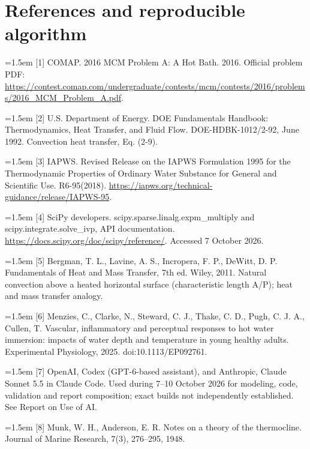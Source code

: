 \documentclass[12pt,a4paper]{article}
\begin{document}
\section{References and reproducible algorithm}
\begingroup\normalsize\setlength{\parindent}{0pt}\hangindent=1.5em [1] COMAP. 2016 MCM Problem A: A Hot Bath. 2016. Official problem PDF: \url{https://contest.comap.com/undergraduate/contests/mcm/contests/2016/problems/2016_MCM_Problem_A.pdf}.\par\endgroup
\begingroup\normalsize\setlength{\parindent}{0pt}\hangindent=1.5em [2] U.S. Department of Energy. DOE Fundamentals Handbook: Thermodynamics, Heat Transfer, and Fluid Flow. DOE-HDBK-1012/2-92, June 1992. Convection heat transfer, Eq. (2-9).\par\endgroup
\begingroup\normalsize\setlength{\parindent}{0pt}\hangindent=1.5em [3] IAPWS. Revised Release on the IAPWS Formulation 1995 for the Thermodynamic Properties of Ordinary Water Substance for General and Scientific Use. R6-95(2018). \url{https://iapws.org/technical-guidance/release/IAPWS-95}.\par\endgroup
\begingroup\normalsize\setlength{\parindent}{0pt}\hangindent=1.5em [4] SciPy developers. scipy.sparse.linalg.expm\_multiply and scipy.integrate.solve\_ivp, API documentation. \url{https://docs.scipy.org/doc/scipy/reference/}. Accessed 7 October 2026.\par\endgroup
\begingroup\normalsize\setlength{\parindent}{0pt}\hangindent=1.5em [5] Bergman, T. L., Lavine, A. S., Incropera, F. P., DeWitt, D. P. Fundamentals of Heat and Mass Transfer, 7th ed. Wiley, 2011. Natural convection above a heated horizontal surface (characteristic length A/P); heat and mass transfer analogy.\par\endgroup
\begingroup\normalsize\setlength{\parindent}{0pt}\hangindent=1.5em [6] Menzies, C., Clarke, N., Steward, C. J., Thake, C. D., Pugh, C. J. A., Cullen, T. Vascular, inflammatory and perceptual responses to hot water immersion: impacts of water depth and temperature in young healthy adults. Experimental Physiology, 2025. doi:10.1113/EP092761.\par\endgroup
\begingroup\normalsize\setlength{\parindent}{0pt}\hangindent=1.5em [7] OpenAI, Codex (GPT-6-based assistant), and Anthropic, Claude Sonnet 5.5 in Claude Code. Used during 7–10 October 2026 for modeling, code, validation and report composition; exact builds not independently established. See Report on Use of AI.\par\endgroup
\begingroup\normalsize\setlength{\parindent}{0pt}\hangindent=1.5em [8] Munk, W. H., Anderson, E. R. Notes on a theory of the thermocline. Journal of Marine Research, 7(3), 276–295, 1948.\par\endgroup
\end{document}

